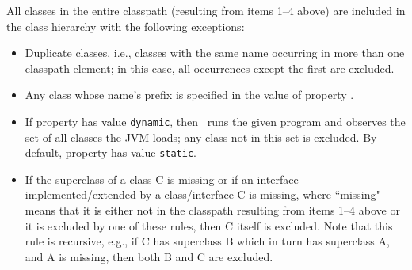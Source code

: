 All classes in the entire classpath (resulting from items 1--4 above) are included in the class hierarchy
with the following exceptions:
\begin{itemize}
\item
Duplicate classes, i.e., classes with the same name occurring in more than one classpath element;
in this case, all occurrences except the first are excluded. 
\item
Any class whose name's prefix is specified in the value of property .
\item
If property  has value {\tt dynamic}, then \Chord\ runs the given program and
observes the set of all classes the JVM loads; any class not in this set is excluded.
By default, property  has value {\tt static}.
\item
If the superclass of a class C is missing or if an interface implemented/extended by a class/interface
C is missing, where ``missing" means that it is either not in the classpath resulting from items 1--4 above
or it is excluded by one of these rules, then C itself is excluded.  Note that this rule is recursive, e.g.,
if C has superclass B which in turn has superclass A, and A is missing, then both B and C are
excluded.
\end{itemize}



